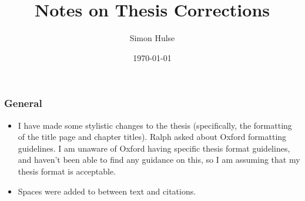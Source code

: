 \documentclass[12pt]{article}
\author{Simon Hulse}
\title{Notes on Thesis Corrections}
\date{\today}
\begin{document}
    \maketitle
    \subsubsection*{General}
    \begin{itemize}
        \item I have made some stylistic changes to the thesis (specifically, the
            formatting of the title page and chapter titles). Ralph asked about Oxford
            formatting guidelines. I am unaware of Oxford having specific thesis format
            guidelines, and haven't been able to find any guidance on this, so I am
            assuming that my thesis format is acceptable.
        \item Spaces were added to between text and citations.
    \end{itemize}
\end{document}
